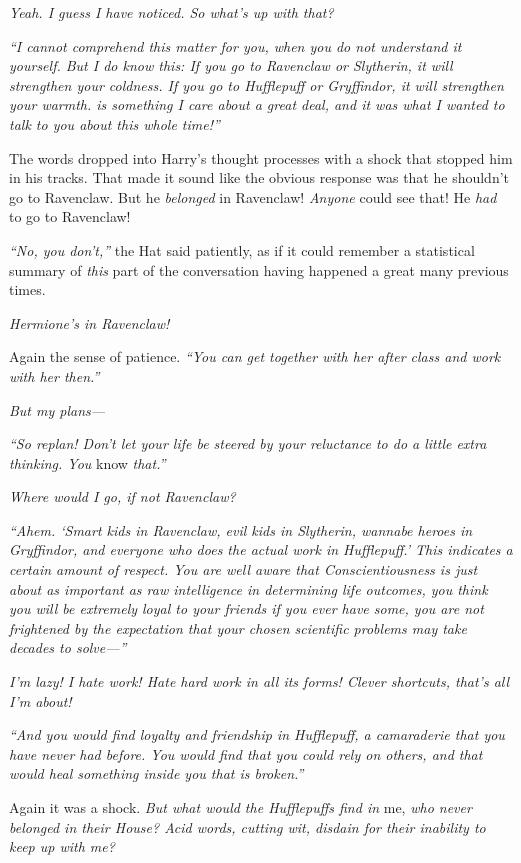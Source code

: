 \emph{Yeah. I guess I have noticed. So what’s up with that?}

\emph{“I cannot comprehend this matter for you, when you do not understand it yourself. But I do know this: If you go to Ravenclaw or Slytherin, it will strengthen your coldness. If you go to Hufflepuff or Gryffindor, it will strengthen your warmth.  is something I care about a great deal, and it was what I wanted to talk to you about this whole time!”}

The words dropped into Harry’s thought processes with a shock that stopped him in his tracks. That made it sound like the obvious response was that he shouldn’t go to Ravenclaw. But he \emph{belonged} in Ravenclaw! \emph{Anyone} could see that! He \emph{had} to go to Ravenclaw!

\emph{“No, you don’t,”} the Hat said patiently, as if it could remember a statistical summary of \emph{this} part of the conversation having happened a great many previous times.

\emph{Hermione’s in Ravenclaw!}

Again the sense of patience. \emph{“You can get together with her after class and work with her then.”}

\emph{But my plans—}

\emph{“So replan! Don’t let your life be steered by your reluctance to do a little extra thinking. You} know \emph{that.”}

\emph{Where would I go, if not Ravenclaw?}

\emph{“Ahem. ‘Smart kids in Ravenclaw, evil kids in Slytherin, wannabe heroes in Gryffindor, and everyone who does the actual work in Hufflepuff.’ This indicates a certain amount of respect. You are well aware that Conscientiousness is just about as important as raw intelligence in determining life outcomes, you think you will be extremely loyal to your friends if you ever have some, you are not frightened by the expectation that your chosen scientific problems may take decades to solve—”}

\emph{I’m lazy! I hate work! Hate hard work in all its forms! Clever shortcuts, that’s all I’m about!}

\emph{“And you would find loyalty and friendship in Hufflepuff, a camaraderie that you have never had before. You would find that you could rely on others, and that would heal something inside you that is broken.”}

Again it was a shock. \emph{But what would the Hufflepuffs find in} me, \emph{who never belonged in their House? Acid words, cutting wit, disdain for their inability to keep up with me?}

